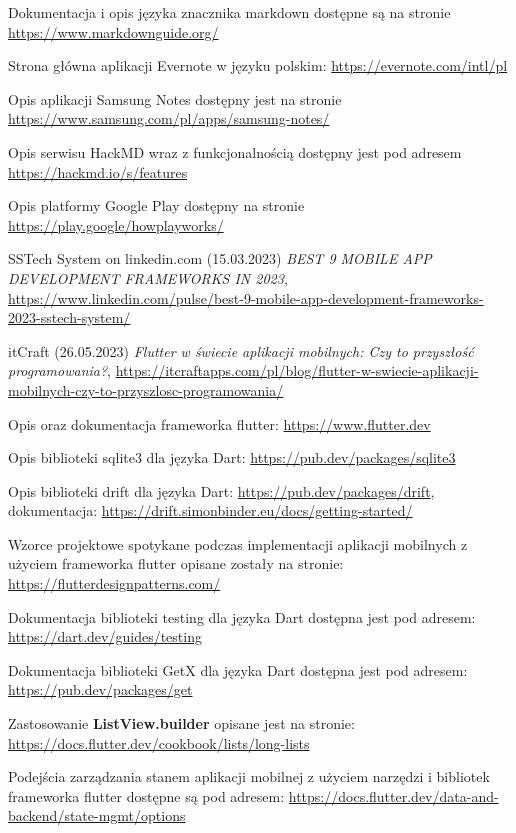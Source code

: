 \documentclass[shortabstract]{iithesis}
\begin{document}
\begin{thebibliography}{1}
Dokumentacja i opis języka znacznika markdown dostępne są na stronie \url{https://www.markdownguide.org/}

Strona główna aplikacji Evernote w języku polskim: \url{https://evernote.com/intl/pl}

Opis aplikacji Samsung Notes dostępny jest na stronie \url{https://www.samsung.com/pl/apps/samsung-notes/}

Opis serwisu HackMD wraz z funkcjonalnością dostępny jest pod adresem \url{https://hackmd.io/s/features}

Opis platformy Google Play dostępny na stronie \url{https://play.google/howplayworks/}

SSTech System on linkedin.com (15.03.2023) \emph{BEST 9 MOBILE APP DEVELOPMENT FRAMEWORKS IN 2023}, \url{https://www.linkedin.com/pulse/best-9-mobile-app-development-frameworks-2023-sstech-system/}

itCraft (26.05.2023) \emph{Flutter w świecie aplikacji mobilnych: Czy to przyszłość programowania?}, \url{https://itcraftapps.com/pl/blog/flutter-w-swiecie-aplikacji-mobilnych-czy-to-przyszlosc-programowania/}

Opis oraz dokumentacja frameworka flutter: \url{https://www.flutter.dev}

Opis biblioteki sqlite3 dla języka Dart: \url{https://pub.dev/packages/sqlite3}

Opis biblioteki drift dla języka Dart: \url{https://pub.dev/packages/drift}, dokumentacja: \url{https://drift.simonbinder.eu/docs/getting-started/}

Wzorce projektowe spotykane podczas implementacji aplikacji mobilnych z użyciem frameworka flutter opisane zostały na stronie: \url{https://flutterdesignpatterns.com/}

Dokumentacja biblioteki testing dla języka Dart dostępna jest pod adresem: \url{https://dart.dev/guides/testing}

Dokumentacja biblioteki GetX dla języka Dart dostępna jest pod adresem: \url{https://pub.dev/packages/get}

Zastosowanie \textbf{ListView.builder} opisane jest na stronie: \url{https://docs.flutter.dev/cookbook/lists/long-lists}

Podejścia zarządzania stanem aplikacji mobilnej z użyciem narzędzi i bibliotek frameworka flutter dostępne są pod adresem: \url{https://docs.flutter.dev/data-and-backend/state-mgmt/options}

\end{thebibliography}
\end{document}
